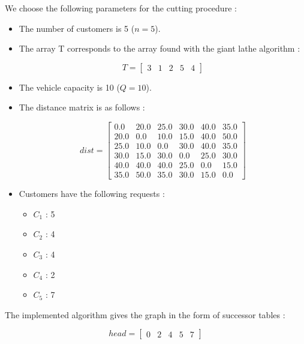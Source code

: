 We choose the following parameters for the cutting procedure :

\begin{itemize}
\item The number of customers is 5 ($n=5$).
\item The array T corresponds to the array found with the giant lathe algorithm :

\begin{displaymath}
T = \begin{bmatrix}
3 & 1 & 2 & 5 & 4
\end{bmatrix}
\end{displaymath}

\item The vehicle capacity is 10 ($Q=10$).
\item The distance matrix is as follows :

\begin{displaymath}
dist = \begin{bmatrix}
0.0	& 20.0	 & 25.0 	& 30.0 	& 40.0 	& 35.0 \\
20.0	& 0.0 	 & 10.0 	& 15.0 	& 40.0 	& 50.0 \\
25.0	& 10.0	 & 0.0 	& 30.0 	& 40.0 	& 35.0 \\
30.0	& 15.0	 & 30.0 	& 0.0 	& 25.0 	& 30.0 \\
40.0	& 40.0	 & 40.0 	& 25.0 	& 0.0 	& 15.0 \\
35.0	& 50.0	 & 35.0	& 30.0 	& 15.0 	& 0.0
\end{bmatrix}
\end{displaymath}

\item Customers have the following requests :

	\begin{itemize}
		\item $C_1$ : 5
		\item $C_2$ : 4
		\item $C_3$ : 4
		\item $C_4$ : 2
		\item $C_5$ : 7
	\end{itemize}
\end{itemize}

The implemented algorithm gives the graph in the form of successor tables :

\begin{displaymath}
head = \begin{bmatrix}
0 & 2 & 4 & 5 & 7
\end{bmatrix}
\end{displaymath}

